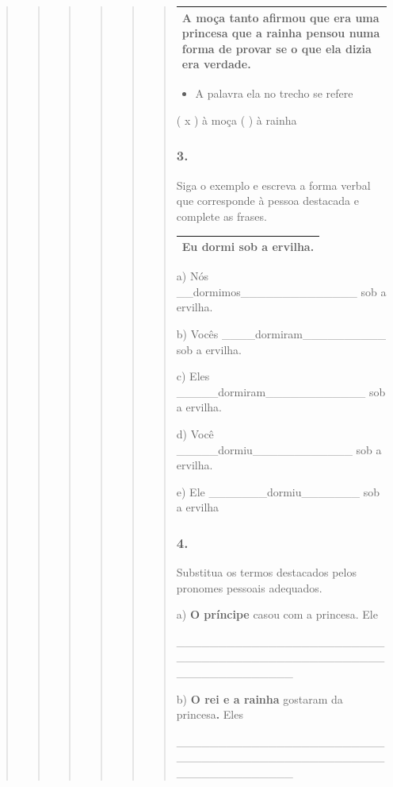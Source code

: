 \begin{quote}
\begin{quote}
\begin{quote}
\begin{quote}
\begin{quote}
\begin{quote}
\begin{longtable}[]{@{}l@{}}
\begin{minipage}[t]{0.97\columnwidth}
A moça tanto afirmou que era uma princesa que a rainha pensou numa forma
de provar se o que ela dizia era verdade.\strut
\end{minipage}\tabularnewline
\bottomrule
\end{longtable}

\begin{itemize}
\item
  A palavra ela no trecho se refere
\end{itemize}

( x ) à moça ( ) à rainha

\subsubsection{3. }\label{section-73}

Siga o exemplo e escreva a forma verbal que corresponde à pessoa
destacada e complete as frases.

\begin{longtable}[]{@{}l@{}}
\toprule
\textbf{Eu dormi} sob a ervilha.\tabularnewline
\bottomrule
\end{longtable}

a) Nós \_\_dormimos\_\_\_\_\_\_\_\_\_\_\_\_\_\_ sob a ervilha.

b) Vocês \_\_\_\_dormiram\_\_\_\_\_\_\_\_\_\_ sob a ervilha.

c) Eles \_\_\_\_\_dormiram\_\_\_\_\_\_\_\_\_\_\_\_ sob a ervilha.

d) Você \_\_\_\_\_dormiu\_\_\_\_\_\_\_\_\_\_\_\_ sob a ervilha.

e) Ele \_\_\_\_\_\_\_dormiu\_\_\_\_\_\_\_ sob a ervilha

\subsubsection{4. }\label{section-74}

Substitua os termos destacados pelos pronomes pessoais adequados.

a) \textbf{O príncipe} casou com a princesa. Ele

\_\_\_\_\_\_\_\_\_\_\_\_\_\_\_\_\_\_\_\_\_\_\_\_\_\_\_\_\_\_\_\_\_\_\_\_\_\_\_\_\_\_\_\_\_\_\_\_\_\_\_\_\_\_\_\_\_\_\_\_\_\_\_\_

b) \textbf{O rei e a rainha} gostaram da princesa\textbf{.} Eles

\_\_\_\_\_\_\_\_\_\_\_\_\_\_\_\_\_\_\_\_\_\_\_\_\_\_\_\_\_\_\_\_\_\_\_\_\_\_\_\_\_\_\_\_\_\_\_\_\_\_\_\_\_\_\_\_\_\_\_\_\_\_\_\_


\end{quote}
\end{quote}
\end{quote}
\end{quote}
\end{quote}
\end{quote}
